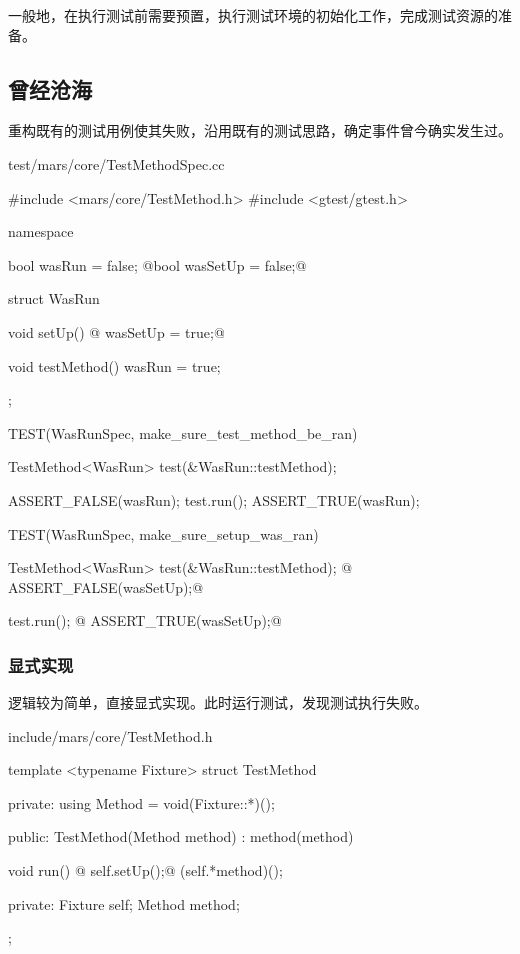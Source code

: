 \begin{content}

一般地，在执行测试前需要预置，执行测试环境的初始化工作，完成测试资源的准备。

\subsection{曾经沧海}

重构既有的测试用例使其失败，沿用既有的测试思路，确定事件曾今确实发生过。

\begin{nodiff}{test/mars/core/TestMethodSpec.cc}
\begin{c++}
#include <mars/core/TestMethod.h>
#include <gtest/gtest.h>

namespace {
  bool wasRun = false;
  @bool wasSetUp = false;@

  struct WasRun {
    void setUp() {
@      wasSetUp = true;@
    }

    void testMethod() {
      wasRun = true;
    }
  };
}

TEST(WasRunSpec, make_sure_test_method_be_ran) {
  TestMethod<WasRun> test(&WasRun::testMethod);

  ASSERT_FALSE(wasRun);
  test.run();
  ASSERT_TRUE(wasRun);
}

TEST(WasRunSpec, make_sure_setup_was_ran) {
  TestMethod<WasRun> test(&WasRun::testMethod);
@  ASSERT_FALSE(wasSetUp);@

  test.run();
@  ASSERT_TRUE(wasSetUp);@
}
\end{c++}
\end{nodiff}

\subsubsection{显式实现}

逻辑较为简单，直接显式实现。此时运行测试，发现测试执行失败。

\begin{nodiff}{include/mars/core/TestMethod.h}
\begin{c++}
template <typename Fixture>
struct TestMethod {
private:
  using Method = void(Fixture::*)();

public:
  TestMethod(Method method)
    : method(method) {}

  void run() {
@    self.setUp();@
    (self.*method)();
  }

private:
  Fixture self;
  Method method;
};
\end{c++}
\end{nodiff}


\end{content}
